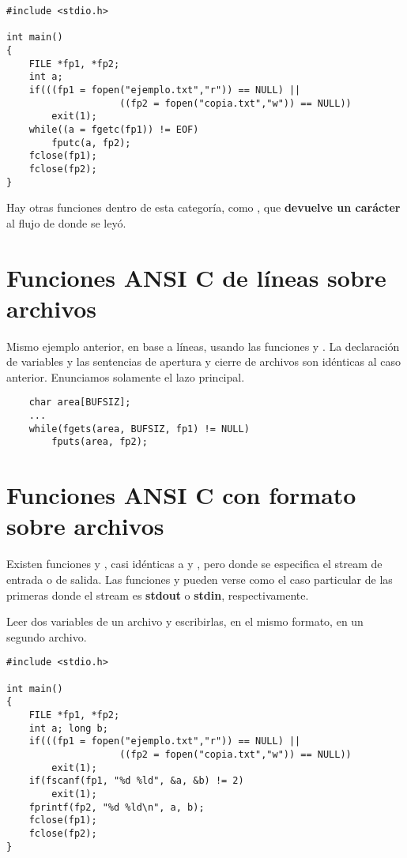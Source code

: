 \begin{lstlisting}
#include <stdio.h>

int main()
{
    FILE *fp1, *fp2;
    int a;
    if(((fp1 = fopen("ejemplo.txt","r")) == NULL) ||
                    ((fp2 = fopen("copia.txt","w")) == NULL))
        exit(1);
    while((a = fgetc(fp1)) != EOF)
        fputc(a, fp2);
    fclose(fp1);
    fclose(fp2);
}
\end{lstlisting}

Hay otras funciones dentro de esta categoría, como , que \textbf{devuelve un
carácter} al flujo de donde se leyó.

\section{Funciones ANSI C de líneas sobre archivos}
\label{subsubsec:esarchivosansiclineas}
Mismo ejemplo anterior, en base a líneas, usando las funciones  y . La
declaración de variables  y las sentencias de apertura y cierre de
archivos son idénticas al caso anterior. Enunciamos solamente el lazo
principal.
    
\begin{lstlisting}
    char area[BUFSIZ];
    ...
    while(fgets(area, BUFSIZ, fp1) != NULL)
        fputs(area, fp2);
\end{lstlisting}

\section{Funciones ANSI C con formato sobre archivos}
\label{subsubsec:esarchivosansicformato}

Existen funciones  y , casi idénticas a  y ,
pero donde se especifica el stream de entrada o de salida. Las funciones  y  pueden verse como el caso particular de las primeras donde el
stream es \textbf{stdout} o \textbf{stdin}, respectivamente.

\begin{ejemplo}
Leer dos variables de un archivo y escribirlas, en el
mismo formato, en un segundo archivo.
\begin{lstlisting}
#include <stdio.h>

int main()
{
    FILE *fp1, *fp2;
    int a; long b;
    if(((fp1 = fopen("ejemplo.txt","r")) == NULL) ||
                    ((fp2 = fopen("copia.txt","w")) == NULL))
        exit(1);
    if(fscanf(fp1, "%d %ld", &a, &b) != 2)
        exit(1);
    fprintf(fp2, "%d %ld\n", a, b);
    fclose(fp1);
    fclose(fp2);
}
\end{lstlisting}
\end{ejemplo}



